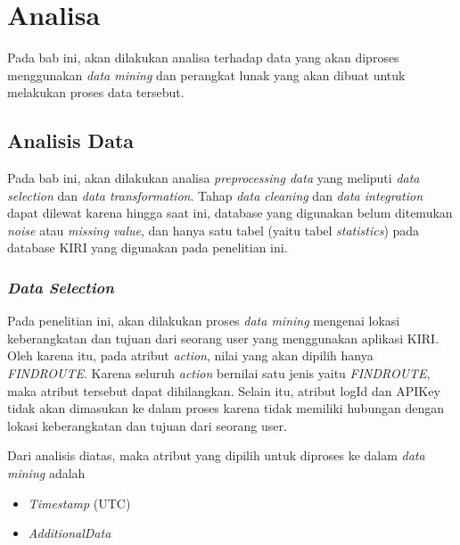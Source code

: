 \chapter{Analisa}

Pada bab ini, akan dilakukan analisa terhadap data yang akan diproses menggunakan \textsl{data mining} dan perangkat lunak yang akan dibuat untuk melakukan proses data tersebut.

\section{Analisis Data}
Pada bab ini, akan dilakukan analisa \textsl{preprocessing data} yang meliputi \textsl{data selection} dan \textsl{data transformation}. Tahap \textsl{data cleaning} dan \textsl{data integration} dapat dilewat karena hingga saat ini, database yang digunakan belum ditemukan \textsl{noise} atau \textsl{missing value}, dan hanya satu tabel (yaitu tabel \textsl{statistics}) pada database KIRI yang digunakan pada penelitian ini.

\subsection{\textsl{Data Selection}}
Pada penelitian ini, akan dilakukan proses \textsl{data mining} mengenai lokasi keberangkatan dan tujuan dari seorang user yang menggunakan aplikasi KIRI. Oleh karena itu, pada atribut \textsl{action}, nilai yang akan dipilih hanya \textsl{FINDROUTE}. Karena seluruh \textsl{action} bernilai satu jenis yaitu \textsl{FINDROUTE}, maka atribut tersebut dapat dihilangkan. Selain itu, atribut logId dan APIKey tidak akan dimasukan ke dalam proses karena tidak memiliki hubungan dengan lokasi keberangkatan dan tujuan dari seorang user.

Dari analisis diatas, maka atribut yang dipilih untuk diproses ke dalam \textsl{data mining} adalah
\begin{itemize}
	\item \textsl{Timestamp} (UTC)
	\item \textsl{AdditionalData}
\end{itemize}

